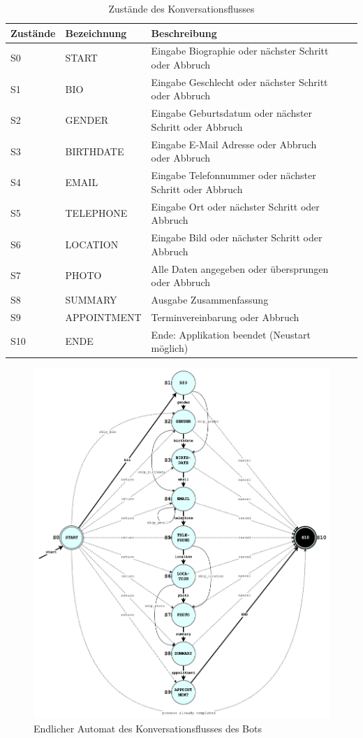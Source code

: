 	\begin{table} %
		\centering
		\begin{tabular}{l | l l l l}
			\textbf{Zustände} 	&		\textbf{Bezeichnung}	&		\textbf{Beschreibung}\\
			\hline
			S0 					&		START 					&		Eingabe Biographie oder nächster Schritt oder Abbruch\\
			S1 					&		BIO 					&		Eingabe Geschlecht oder nächster Schritt oder Abbruch\\
			S2 					&		GENDER 					&		Eingabe Geburtsdatum oder nächster Schritt oder Abbruch\\
			S3 					&		BIRTHDATE 				&		Eingabe E-Mail Adresse oder Abbruch oder Abbruch\\
			S4 					&		EMAIL 					&		Eingabe Telefonnummer oder nächster Schritt oder Abbruch\\
			S5 					&		TELEPHONE 				&		Eingabe Ort oder nächster Schritt oder Abbruch\\
			S6 					&		LOCATION 				&		Eingabe Bild oder nächster Schritt oder Abbruch\\
			S7 					&		PHOTO 					&		Alle Daten angegeben oder übersprungen oder Abbruch\\
			S8 					&		SUMMARY 				&		Ausgabe Zusammenfassung\\
			S9 					&		APPOINTMENT				&		Terminvereinbarung oder Abbruch\\
			S10 				&		ENDE 					&		Ende: Applikation beendet (Neustart möglich)\\
			
		\end{tabular}
		\caption{Zustände des Konversationsflusses}
		\label{tab: states}
	\end{table}
	
	\begin{figure} %
		\centering
		\includegraphics[width=1.0\textwidth]{images/220326_PA28464_State-Machine.png}
		\caption{Endlicher Automat des Konversationsflusses des Bots}
		\label{fig: state machine}
	\end{figure}
	